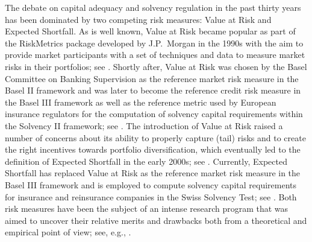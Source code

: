 \documentclass[12pt]{article}
\theoremstyle{plain}
\theoremstyle{definition}
\theoremstyle{remark}
\numberwithin{equation}{section}
\begin{document}
The debate on capital adequacy and solvency regulation in the past thirty years has been dominated by two competing risk measures: Value at Risk and Expected Shortfall. As is well known, Value at Risk became popular as part of the RiskMetrics package developed by J.P.\ Morgan in the 1990s with the aim to provide market participants with a set of techniques and data
to measure market risks in their portfolios; see \cite{RiskMetrics}. Shortly after, Value at Risk was chosen by the Basel Committee on Banking Supervision as the reference market risk measure in the Basel II framework and was later to become the reference credit risk measure in the Basel III framework as well as the reference metric used by European insurance regulators for the computation of solvency capital requirements within the Solvency II framework; see \cite{BaselII,BaselIIIb,SolvencyII}. The introduction of Value at Risk raised a number of concerns about its ability to properly capture (tail) risks and to create the right incentives towards portfolio diversification, which eventually led to the definition of Expected Shortfall in the early 2000s; see \cite{AcerbiTasche2002,ArtznerDelbaenEberHeath1999,BertsimasLaupreteSamarov2004,Pflug2000,RockafellarUryasev2000,RockafellarUryasev2002}. Currently, Expected Shortfall has replaced Value at Risk as the reference market risk measure in the Basel III framework and is employed to compute solvency capital requirements for insurance and reinsurance companies in the Swiss Solvency Test; see \cite{BaselIII,SST}. Both risk measures have been the subject of an intense research program that was aimed to uncover their relative merits and drawbacks both from a theoretical and empirical point of view; see, e.g., \cite{AcerbiSzekely2014,BarrieuScandolo2015,BignozziBurzoniMunari2020,BurzoniMunariWang2022,ContDeguestScandolo2010,KochMunari2016,KraetschmerSchiedZaehle2014,MaoWang2020,MunariWeberWilhelmy2022,WangZitikis2021,Weber2018,YamaiYoshiba2005,Ziegel2016}.

\smallskip
\end{document}
